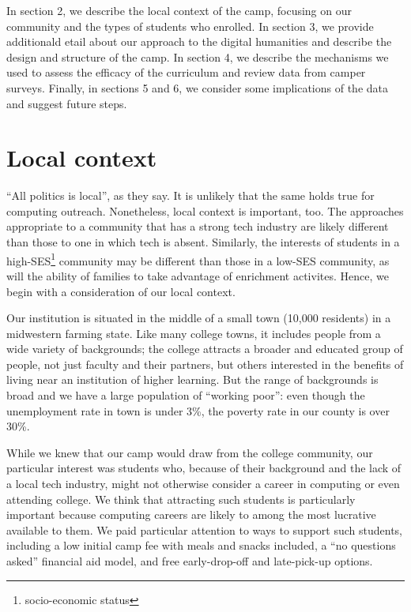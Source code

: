 In section 2, we describe the local context of the camp, focusing
on our community and the types of students who enrolled.  In section
3, we provide additionald etail about our approach to the digital
humanities and describe the design and structure of the camp.  In
section 4, we describe the mechanisms we used to assess the efficacy
of the curriculum and review data from camper surveys.  Finally,
in sections 5 and 6, we consider some implications of the data and
suggest future steps.

\section{Local context}

``All politics is local'', as they say.  It is unlikely that the
same holds true for computing outreach.  Nonetheless, local context
is important, too.  The approaches appropriate to a community that
has a strong tech industry are likely different than those to one
in which tech is absent.  Similarly, the interests of students in
a high-SES\footnote{socio-economic status} community may be different
than those in a low-SES community, as will the ability of families
to take advantage of enrichment activites.  Hence, we begin with a
consideration of our local context.

Our institution is situated in the middle of a small town (10,000
residents) in a midwestern farming state.  Like many college towns,
it includes people from a wide variety of backgrounds; the college
attracts a broader and educated group of people, not just faculty
and their partners, but others interested in the benefits of living
near an institution of higher learning.  But the range of backgrounds
is broad and we have a large population of ``working poor'': even
though the unemployment rate in town is under 3\%, the poverty rate
in our county is over 30\%.

While we knew that our camp would draw from the college community,
our particular interest was students who, because of their background
and the lack of a local tech industry, might not otherwise consider
a career in computing or even attending college.  We think that
attracting such students is particularly important because computing
careers are likely to among the most lucrative available to them.
We paid particular attention to ways to support such students,
including a low initial camp fee with meals and snacks included, a
``no questions asked'' financial aid model, and free early-drop-off
and late-pick-up options.

